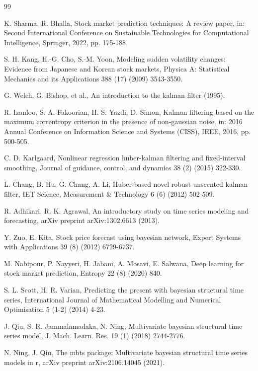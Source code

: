 \documentclass[12pt,a4paper]{article}
\begin{document}
	\sloppy
	
	\begin{thebibliography}{99}
		
		 K. Sharma, R. Bhalla, Stock market prediction techniques: A review paper, in: Second International Conference on Sustainable Technologies for Computational Intelligence, Springer, 2022, pp. 175-188.
		
		 S. H. Kang, H.-G. Cho, S.-M. Yoon, Modeling sudden volatility changes: Evidence from Japanese and Korean stock markets, Physica A: Statistical Mechanics and its Applications 388 (17) (2009) 3543-3550.
		
		 G. Welch, G. Bishop, et al., An introduction to the kalman filter (1995).
		
		 R. Izanloo, S. A. Fakoorian, H. S. Yazdi, D. Simon, Kalman filtering based on the maximum correntropy criterion in the presence of non-gaussian noise, in: 2016 Annual Conference on Information Science and Systems (CISS), IEEE, 2016, pp. 500-505.
		
		 C. D. Karlgaard, Nonlinear regression huber-kalman filtering and fixed-interval smoothing, Journal of guidance, control, and dynamics 38 (2) (2015) 322-330.
		
		 L. Chang, B. Hu, G. Chang, A. Li, Huber-based novel robust unscented kalman filter, IET Science, Measurement \& Technology 6 (6) (2012) 502-509.
		
		 R. Adhikari, R. K. Agrawal, An introductory study on time series modeling and forecasting, arXiv preprint arXiv:1302.6613 (2013).
		
		 Y. Zuo, E. Kita, Stock price forecast using bayesian network, Expert Systems with Applications 39 (8) (2012) 6729-6737.
		
		 M. Nabipour, P. Nayyeri, H. Jabani, A. Mosavi, E. Salwana, Deep learning for stock market prediction, Entropy 22 (8) (2020) 840.
		
		 S. L. Scott, H. R. Varian, Predicting the present with bayesian structural time series, International Journal of Mathematical Modelling and Numerical Optimisation 5 (1-2) (2014) 4-23.
		
		 J. Qiu, S. R. Jammalamadaka, N. Ning, Multivariate bayesian structural time series model, J. Mach. Learn. Res. 19 (1) (2018) 2744-2776.
		
		 N. Ning, J. Qiu, The mbts package: Multivariate bayesian structural time series models in r, arXiv preprint arXiv:2106.14045 (2021).
		

\end{thebibliography}
\end{document}
